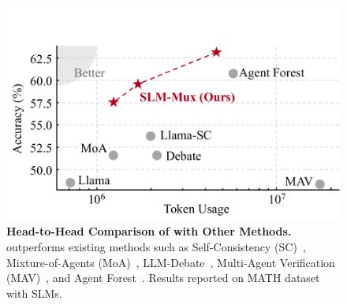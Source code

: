 \begin{figure}
  \centering
  \vspace{-5pt}
  \includegraphics[width=\linewidth]{Figures/scatter_v3.pdf}
  \vspace{-15pt}
  \caption{\small \textbf{Head-to-Head Comparison of \NAME{} with Other Methods.} \NAME{} outperforms existing methods such as Self-Consistency (SC)~\citep{wang2023selfconsistencyimproveschainthought}, Mixture-of-Agents (MoA)~\citep{wang2024mixtureofagentsenhanceslargelanguage}, LLM-Debate~\citep{du2023improvingfactualityreasoninglanguage}, Multi-Agent Verification (MAV)~\citep{lifshitz2025multiagentverificationscalingtesttime}, and Agent Forest~\citep{li2024agentsneed}. Results reported on \textsc{MATH} dataset with SLMs.}
  \label{fig:token-accuracy}
  \vspace{-20pt}
\end{figure}


